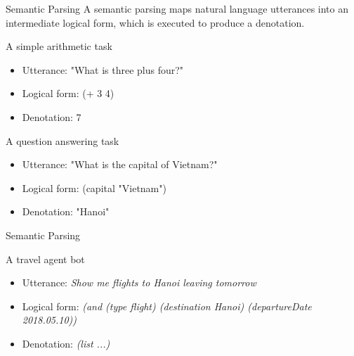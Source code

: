\documentclass{beamer}
\begin{document}
\begin{frame}{Semantic Parsing}
A semantic parsing maps natural language utterances into an intermediate logical form, which is executed to produce a denotation.

\begin{block}{A simple arithmetic task}
    \begin{itemize}
        \item Utterance: "What is three plus four?"
        \item Logical form: (+ 3 4)
        \item Denotation: 7
    \end{itemize}
\end{block}

\begin{block}{A question answering task}
    \begin{itemize}
        \item Utterance: "What is the capital of Vietnam?"
        \item Logical form: (capital "Vietnam")
        \item Denotation: "Hanoi"
    \end{itemize}
\end{block}

\end{frame}

\begin{frame}{Semantic Parsing}

\begin{block}{A travel agent bot}
    \begin{itemize}
        \item Utterance: \textit{Show me flights to Hanoi leaving tomorrow}
        \item Logical form: \textit{(and (type flight) (destination Hanoi) (departureDate 2018.05.10))}
        \item Denotation: \textit{(list ...)}
    \end{itemize}
\end{block}

\end{frame}
\end{document}
